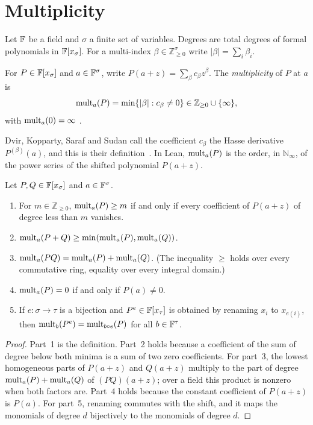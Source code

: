 \section{Multiplicity}\label{sec:prelim}

Let \(\mathbb F\) be a field and \(\sigma\) a finite set of variables. Degrees are total
degrees of formal polynomials in \(\mathbb F[x_\sigma]\). For a multi-index
\(\beta\in\mathbb Z_{\ge0}^\sigma\) write \(|\beta|=\sum_i\beta_i\).

\begin{definition}\label{def:mult}
For \(P\in\mathbb F[x_\sigma]\) and \(a\in\mathbb F^\sigma\), write
\(P(a+z)=\sum_\beta c_\beta z^\beta\). The \emph{multiplicity} of \(P\) at \(a\) is
\[
 \operatorname{mult}_a(P)=\min\{|\beta|:c_\beta\ne0\}\in\mathbb Z_{\ge0}\cup\{\infty\},
\]
with \(\operatorname{mult}_a(0)=\infty\)
.
\end{definition}

Dvir, Kopparty, Saraf and Sudan call the coefficient \(c_\beta\) the Hasse derivative
\(P^{(\beta)}(a)\), and this is their definition~\cite[Definition~2.2]{DKSS13}.
In Lean, \(\operatorname{mult}_a(P)\) is the order, in \(\mathbb N_\infty\), of the power series of
the shifted polynomial \(P(a+z)\).

\begin{lemma}\label{lem:mult-basic}
Let \(P,Q\in\mathbb F[x_\sigma]\) and \(a\in\mathbb F^\sigma\).
\begin{enumerate}
 \item For \(m\in\mathbb Z_{\ge0}\), \(\operatorname{mult}_a(P)\ge m\) if and only if every
 coefficient of \(P(a+z)\) of degree less than \(m\) vanishes.
 \item \(\operatorname{mult}_a(P+Q)\ge\min(\operatorname{mult}_a(P),\operatorname{mult}_a(Q))\).
 \item \(\operatorname{mult}_a(PQ)=\operatorname{mult}_a(P)+\operatorname{mult}_a(Q)\). (The inequality \(\ge\) holds over
 every commutative ring, equality over every integral domain.)
 \item \(\operatorname{mult}_a(P)=0\) if and only if \(P(a)\ne0\).
 \item If \(e:\sigma\to\tau\) is a bijection and \(P^e\in\mathbb F[x_\tau]\) is obtained by
 renaming \(x_i\) to \(x_{e(i)}\), then \(\operatorname{mult}_b(P^e)=\operatorname{mult}_{b\circ e}(P)\) for all
 \(b\in\mathbb F^\tau\).
\end{enumerate}
\end{lemma}

\begin{proof}
Part~1 is the definition. Part~2 holds because a coefficient of the sum of degree
below both minima is a sum of two zero coefficients. For part~3, the lowest
homogeneous parts of \(P(a+z)\) and \(Q(a+z)\) multiply to the part of degree
\(\operatorname{mult}_a(P)+\operatorname{mult}_a(Q)\) of \((PQ)(a+z)\); over a field this product is nonzero
when both factors are. Part~4 holds because the constant coefficient of
\(P(a+z)\) is \(P(a)\). For part~5, renaming commutes with the shift, and it
maps the monomials of degree \(d\) bijectively to the monomials of degree \(d\).
\end{proof}

